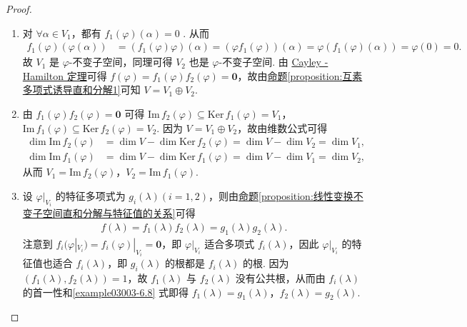 \documentclass[../../main.tex]{subfiles}
\begin{document}
\begin{proof}
\begin{enumerate}[(1)]
\item  对 $\forall \alpha\in V_1$，都有 $f_1(\varphi)(\alpha)=0$ . 从而
\begin{align*}
f_1(\varphi)(\varphi(\alpha))&=(f_1(\varphi)\varphi)(\alpha)=(\varphi f_1(\varphi))(\alpha)=\varphi(f_1(\varphi)(\alpha))=\varphi(0)=0.
\end{align*}
故 $V_1$ 是 $\varphi$-不变子空间，同理可得 $V_2$ 也是 $\varphi$-不变子空间. 
由 \hyperref[theorem:Cayley-Hamilton定理]{Cayley - Hamilton 定理}可得 $f(\varphi)=f_1(\varphi)f_2(\varphi)=\mathbf{0}$，故由\hyperref[proposition:互素多项式诱导直和分解1]{命题\ref{proposition:互素多项式诱导直和分解1}}可知 $V = V_1\oplus V_2$.

\item 由 $f_1(\varphi)f_2(\varphi)=\mathbf{0}$ 可得 $\mathrm{Im}\,f_2(\varphi)\subseteq\mathrm{Ker}\,f_1(\varphi)=V_1$，$\mathrm{Im}\,f_1(\varphi)\subseteq\mathrm{Ker}\,f_2(\varphi)=V_2$. 因为 $V = V_1\oplus V_2$，故由维数公式可得
\begin{align*}
\dim\mathrm{Im}\,f_2(\varphi)&=\dim V - \dim\mathrm{Ker}\,f_2(\varphi)=\dim V - \dim V_2=\dim V_1,\\
\dim\mathrm{Im}\,f_1(\varphi)&=\dim V - \dim\mathrm{Ker}\,f_1(\varphi)=\dim V - \dim V_1=\dim V_2,
\end{align*}
从而 $V_1 = \mathrm{Im}\,f_2(\varphi)$，$V_2 = \mathrm{Im}\,f_1(\varphi)$.

\item 设 $\varphi|_{V_i}$ 的特征多项式为 $g_i(\lambda) (i = 1,2)$，则由\hyperref[proposition:线性变换不变子空间直和分解与特征值的关系]{命题\ref{proposition:线性变换不变子空间直和分解与特征值的关系}}可得
\begin{align}
f(\lambda)=f_1(\lambda)f_2(\lambda)=g_1(\lambda)g_2(\lambda). \label{example03003-6.8}
\end{align}
注意到 $f_i(\varphi|_{V_i})=f_i(\varphi)|_{V_i}=\mathbf{0}$，即 $\varphi|_{V_i}$ 适合多项式 $f_i(\lambda)$，因此 $\varphi|_{V_i}$ 的特征值也适合 $f_i(\lambda)$，即 $g_i(\lambda)$ 的根都是 $f_i(\lambda)$ 的根. 因为 $(f_1(\lambda),f_2(\lambda)) = 1$，故 $f_1(\lambda)$ 与 $f_2(\lambda)$ 没有公共根，从而由 $f_i(\lambda)$ 的首一性和\eqref{example03003-6.8} 式即得 $f_1(\lambda)=g_1(\lambda)$，$f_2(\lambda)=g_2(\lambda)$. 
\end{enumerate}
\end{proof}
\end{document}

